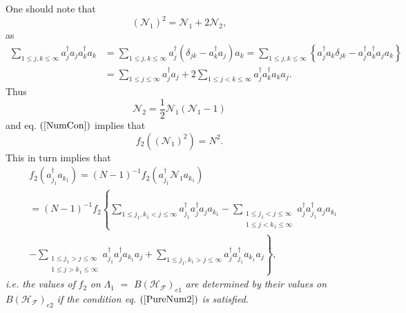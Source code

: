 \documentclass[aps,preprint]{revtex4}%
\begin{document}
One should note that
\begin{equation}
\left(  \mathcal{N}_{1}\right)  ^{2}=\mathcal{N}_{1}+2\mathcal{N}_{2},
\end{equation}
as%
\begin{align}
\sum_{1\leq j,k\leq\infty}a_{j}^{\dagger}a_{j}a_{k}^{\dagger}a_{k}  &
=\sum_{1\leq j,k\leq\infty}a_{j}^{\dagger}\left(  \delta_{jk}-a_{k}^{\dagger
}a_{j}\right)  a_{k}=\sum_{1\leq j,k\leq\infty}\left\{  a_{j}^{\dagger}%
a_{k}\delta_{jk}-a_{j}^{\dagger}a_{k}^{\dagger}a_{j}a_{k}\right\} \nonumber\\
&  =\sum_{1\leq j\leq\infty}a_{j}^{\dagger}a_{j}+2\sum_{1\leq j<k\leq\infty
}a_{j}^{\dagger}a_{k}^{\dagger}a_{k}a_{j}.
\end{align}
Thus
\begin{equation}
\mathcal{N}_{2}=\frac{1}{2}\mathcal{N}_{1}\left(  \mathcal{N}_{1}-1\right)
\end{equation}
and eq. $\left(  \ref{NumCon}\right)  $ implies that
\begin{equation}
f_{2}\left(  \left(  \mathcal{N}_{1}\right)  ^{2}\right)  =N^{2}.
\label{PureNum2}%
\end{equation}
This in turn implies that
\begin{align}
&  f_{2}\left(  a_{j_{1}}^{\dagger}a_{k_{1}}\right)  =\left(  N-1\right)
^{-1}f_{2}\left(  a_{j_{1}}^{\dagger}\mathcal{N}_{1}a_{k_{1}}\right)
\nonumber\\
&  =\left(  N-1\right)  ^{-1}f_{2}\left\{  \sum_{1\leq j_{1},k_{1}<j\leq
\infty}a_{j_{1}}^{\dagger}a_{j}^{\dagger}a_{j}a_{k_{1}}-\sum_{\substack{1\leq
j_{1}<j\leq\infty\\1\leq j<k_{1}\leq\infty}}a_{j}^{\dagger}a_{j_{1}}^{\dagger
}a_{j}a_{k_{1}}\right. \nonumber\\
&  \left.  -\sum_{\substack{1\leq j_{1}>j\leq\infty\\1\leq j>k_{1}\leq\infty
}}a_{j_{1}}^{\dagger}a_{j}^{\dagger}a_{k_{1}}a_{j}+\sum_{1\leq j_{1}%
,k_{1}>j\leq\infty}a_{j}^{\dagger}a_{j_{1}}^{\dagger}a_{k_{1}}a_{j}\right\}  ,
\end{align}
\emph{i.e. the values of }$f_{2}$\emph{ on }$\Lambda_{1}$\emph{ }$=$\emph{
}$B\left(  \mathcal{H}_{\mathcal{F}}\right)  _{e1}$\emph{ are determined by
their values on }$B\left(  \mathcal{H}_{\mathcal{F}}\right)  _{e2}$\emph{ if
the condition eq. }$\left(  \ref{PureNum2}\right)  $\emph{ is satisfied.}
\end{document}
